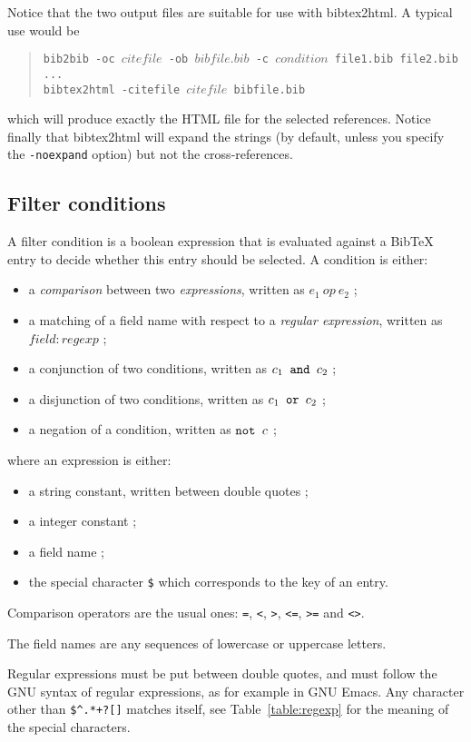 \documentclass[11pt,a4paper]{article}
\begin{document}
Notice that the two output files are suitable for use with
bibtex2html.  A typical use would be
\begin{quote}
\texttt{bib2bib -oc $citefile$ -ob $bibfile.bib$ -c $condition$
  file1.bib file2.bib ... } \\
\texttt{bibtex2html -citefile $citefile$ bibfile.bib}
\end{quote}
which will produce exactly the HTML file for the selected
references. Notice finally that bibtex2html will expand the strings
(by default, unless you specify the \verb|-noexpand| option) but not
the cross-references.

\subsection{Filter conditions}

A filter condition is a boolean expression that is evaluated against a
BibTeX entry to decide whether this entry should be selected. A
condition is either:
\begin{itemize}
\item a \emph{comparison} between two \emph{expressions}, written as
  $e_1~op~e_2$ ; 
\item a matching of a field name with respect to a \emph{regular
    expression}, written as $field : regexp$ ; 
\item a conjunction of two conditions, written as $c_1 \verb| and |
  c_2$ ;
\item a disjunction of two conditions, written as $c_1 \verb| or |
  c_2$ ;
\item a negation of a condition, written as $\verb|not | c$ ;
\end{itemize}
where an expression is either:
\begin{itemize}
\item a string constant, written between double quotes ;
\item a integer constant ;
\item a field name ;
\item the special character \verb|$| which corresponds to the key of
  an entry.
\end{itemize} 

Comparison operators are the usual ones: \texttt{=}, \texttt{<},
\texttt{>}, \texttt{<=}, \texttt{>=} and \texttt{<>}. 

The field names are any sequences of lowercase or uppercase letters.

Regular expressions must be put between double quotes, and must follow
the GNU syntax of regular expressions, as for example in GNU
Emacs. Any character other than \verb|$^.*+?[]| matches itself, see
Table~\ref{table:regexp} for the meaning of the special characters. 
\end{document}
